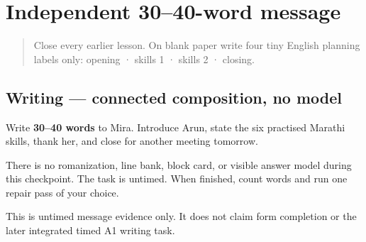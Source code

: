 \section[independent named-reader message]{Independent 30–40-word message}

\label{lesson:MR-A1M18-independent-message}



\begin{quote}
Close every earlier lesson. On blank paper write four tiny English planning labels only: opening · skills 1 · skills 2 · closing.
\end{quote}

\subsection*{Writing — connected composition, no model}
Write \textbf{30–40 words} to Mira. Introduce Arun, state the six practised Marathi skills, thank her, and close for another meeting tomorrow.

There is no romanization, line bank, block card, or visible answer model during this checkpoint. The task is untimed. When finished, count words and run one repair pass of your choice.

\begin{tcolorbox}[breakable,colback=teal!4,colframe=teal!35!black,title={Before you move on}]
This is untimed message evidence only. It does not claim form completion or the later integrated timed A1 writing task.
\end{tcolorbox}
